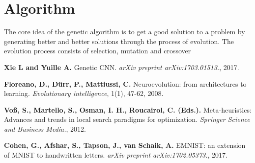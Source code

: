 \documentclass[eng]{simposium}
\begin{document}
\section{Algorithm}

The core idea of the genetic algorithm is to get a good solution to a problem by generating better and better solutions through the process of evolution.
The evolution process consists of selection, mutation and crossover

\begin{thebibliography}{99}
\textbf{Xie L and Yuille A.} Genetic CNN. \emph{arXiv preprint arXiv:1703.01513.}, 2017.

\textbf{Floreano, D., Dürr, P., Mattiussi, C.} Neuroevolution: from architectures to learning. \emph{Evolutionary intelligence}, 1(1), 47-62, 2008.

\textbf{Voß, S., Martello, S., Osman, I. H., Roucairol, C. (Eds.).} Meta-heuristics: Advances and trends in local search paradigms for optimization. \emph{Springer Science and Business Media.}, 2012.

\textbf{Cohen, G., Afshar, S., Tapson, J., van Schaik, A.} EMNIST: an extension of MNIST to handwritten letters. \emph{arXiv preprint arXiv:1702.05373.}, 2017.

\end{thebibliography}
\end{document}
